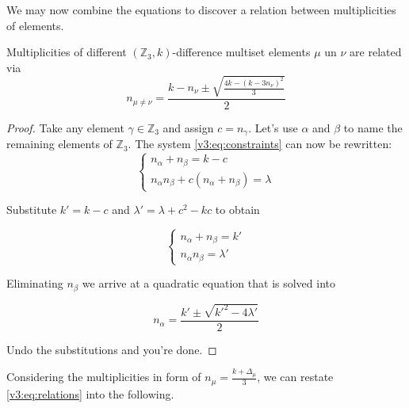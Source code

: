     We may now combine the equations to discover a relation between multiplicities of elements.

    \begin{theorem}
        \label{v3:theorem:relations}
        Multiplicities of different $(\mathbb Z_3,k)$-difference multiset elements $\mu$ un $\nu$ are related via
        \begin{equation}
            \label{v3:eq:relations}
            n_{\mu\neq \nu} = \frac{k-n_\nu \pm \sqrt{\frac{4k-(k-3n_\nu)^2}{3}}}{2}
        \end{equation}
    \end{theorem}

    \begin{proof}
        Take any element $\gamma \in \mathbb Z_3$ and assign $c = n_\gamma$. Let's use $\alpha$ and $\beta$ to name the remaining elements of $\mathbb Z_3$. The system \eqref{v3:eq:constraints} can now be rewritten:
        \begin{equation}
            \begin{cases}
                n_\alpha + n_\beta = k - c \\
                n_\alpha n_\beta + c (n_\alpha + n_\beta)  = \lambda 
            \end{cases}
        \end{equation}
        
        Substitute $k'=k-c$ and $\lambda' = \lambda + c^2-kc$ to obtain
        
        \begin{equation}
            \begin{cases}
                n_\alpha + n_\beta = k' \\
                n_\alpha n_\beta = \lambda'
            \end{cases}
        \end{equation}
        
        Eliminating $n_\beta$ we arrive at a quadratic equation that is solved into
        
        \begin{equation}
            n_\alpha = \frac{k' \pm \sqrt{k'^2-4\lambda'}}{2}
        \end{equation}
        
        Undo the substitutions and you're done.
    \end{proof}

    Considering the multiplicities in form of $n_\mu = \frac{k+\Delta_\mu}{3}$, we can restate \eqref{v3:eq:relations} into the following.


